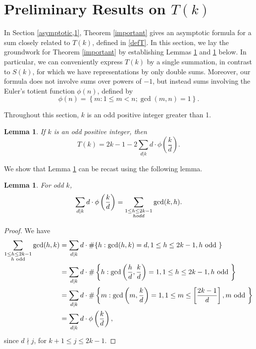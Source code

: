 \documentclass[11pt,reqno]{amsart}
\theoremstyle{plain}
\numberwithin{equation}{section}
\newtheorem{lemma}[theorem]{Lemma}
\begin{document}
\section{Preliminary Results on $T(k)$}\label{odd}


In Section \ref{asymptotic,1},  Theorem \ref{important} gives an asymptotic formula for a sum closely related to $T(k)$, defined in \eqref{defT}.  In this section, we lay the groundwork for Theorem \ref{important} by establishing Lemmas \ref{classify} and \ref{classify2} below. In particular, we can conveniently express $T(k)$ by  a single summation, in contrast to $S(k)$, for which we have representations by only  double sums. Moreover, our formula does not involve sums over powers of $-1$, but instead sums involving the Euler's totient function $\phi(n)$, defined by
$$ \phi(n)= \left\{m: 1\leq m < n; \gcd(m,n)=1\right\}. $$

Throughout this section, $k$ is an odd positive integer greater than 1.

\begin{lemma}\label{classify} If $k$ is an odd positive integer, then
\begin{equation*}
T(k)= 2k - 1 - 2\sum\limits_{d|k} d\cdot\phi\left(\frac{k}{d}\right).\label{classify1}
\end{equation*}
\end{lemma}

We show that Lemma \ref{classify} can be recast using  the following lemma.

\begin{lemma}\label{classify2} For odd $k$,
\begin{equation*}\label{classify3}
\sum\limits_{d|k} d\cdot\phi\left(\frac{k}{d}\right)=\sum\limits_{\substack{1\leq h \leq 2k - 1 \\ h \textup{ odd}}}  \gcd(k,h).
\end{equation*}
\end{lemma}

\begin{proof}
\allowdisplaybreaks
We have
\begin{align}\label{classify4}
\sum\limits_{\substack{1\leq h \leq 2k - 1 \\ h \text{ odd}}}  \gcd(h,k) &= \sum\limits_{d|k}d\cdot \# \{h:\gcd(h,k) = d, 1\leq h \leq 2k-1, h \text{ odd }\}\notag\\
&=\sum\limits_{d|k} d\cdot\# \left\{h:\gcd\left(\frac{h}{d},\frac{k}{d}\right) = 1, 1\leq h \leq 2k-1, h \text{ odd }\right\}\notag\\
&=\sum\limits_{d|k} d\cdot \# \left\{m:\gcd\left(m,\frac{k}{d}\right) = 1, 1\leq m\leq \left[\dfrac{2k-1}{d}\right], m \text{ odd }\right\}\notag\\
&=\sum\limits_{d|k} d\cdot\phi\left(\frac{k}{d}\right),
\end{align}
since $d\nmid j$, for $k+1\leq j\leq 2k-1.$
\end{proof}
\end{document}
